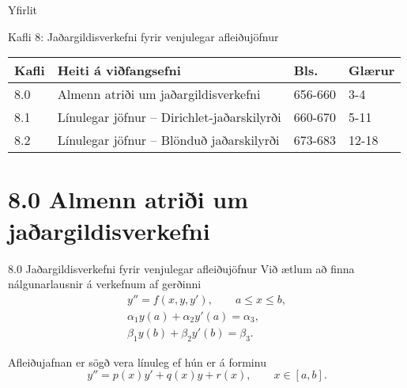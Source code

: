 \date{18.~og 20.~mars, 2015}



\begin{frame}
	\maketitle
\end{frame}

\begin{frame}{Yfirlit}
\begin{block}{Kafli 8: Jaðargildisverkefni fyrir 
  venjulegar afleiðujöfnur}
\begin{center}
\begin{tabular}{|l|l|l|l|}\hline
Kafli &Heiti á viðfangsefni &Bls. & Glærur\\
\hline
8.0 &Almenn atriði um jaðargildisverkefni & 656-660 & 3-4\\
8.1 & Línulegar jöfnur -- Dirichlet-jaðarskilyrði & 660-670 & 5-11\\
8.2 & Línulegar jöfnur -- Blönduð jaðarskilyrði & 673-683 & 12-18 \\
\hline
\end{tabular}
\end{center}
\end{block}
\end{frame}

\section*{8.0 Almenn atriði um jaðargildisverkefni}
\begin{frame}{8.0  Jaðargildisverkefni fyrir venjulegar afleiðujöfnur} 
Við ætlum að finna nálgunarlausnir á verkefnum af gerðinni
  \begin{gather*}
    y''=f(x,y,y'), \qquad a\leq x\leq b,\\
\alpha_1y(a)+\alpha_2 y'(a)=\alpha_3,\\
\beta_1 y(b)+\beta_2y'(b)=\beta_3.  
  \end{gather*}

\pause
Afleiðujafnan er sögð vera línuleg ef hún er á forminu
$$
y''=p(x)y'+q(x)y+r(x), \qquad x\in [a,b].
$$
\end{frame}

